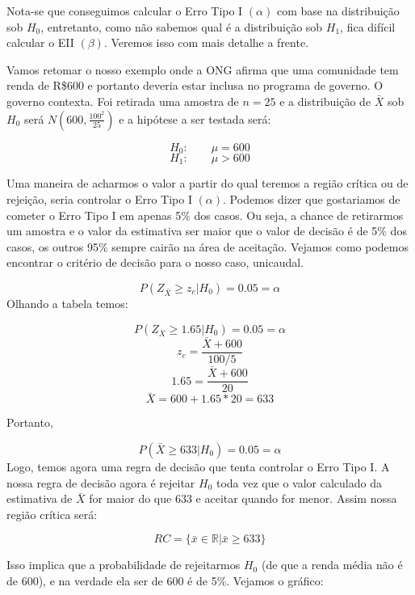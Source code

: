 \documentclass[
  letterpaper,
  DIV=11,
  numbers=noendperiod]{scrartcl}
\begin{document}
Nota-se que conseguimos calcular o Erro Tipo I \((\alpha)\) com base na
distribuição sob \(H_0\), entretanto, como não sabemos qual é a
distribuição sob \(H_1\), fica difícil calcular o EII \((\beta)\).
Veremos isso com mais detalhe a frente.

Vamos retomar o nosso exemplo onde a ONG afirma que uma comunidade tem
renda de R\$600 e portanto deveria estar inclusa no programa de governo.
O governo contexta. Foi retirada uma amostra de \(n=25\) e a
distribuição de \(\bar{X}\) sob \(H_0\) será \(N(600,\frac{100^2}{25})\)
e a hipótese a ser testada será:

\[H_0: \qquad \mu=600\] \[H_1: \qquad \mu>600\]

Uma maneira de acharmos o valor a partir do qual teremos a região
crítica ou de rejeição, seria controlar o Erro Tipo I \((\alpha)\).
Podemos dizer que gostariamos de cometer o Erro Tipo I em apenas 5\% dos
casos. Ou seja, a chance de retirarmos um amostra e o valor da
estimativa ser maior que o valor de decisão é de 5\% dos casos, os
outros 95\% sempre cairão na área de aceitação. Vejamos como podemos
encontrar o critério de decisão para o nosso caso, unicaudal.

\[P(Z_{\bar{X}} \geq z_c|H_0)=0.05= \alpha\] Olhando a tabela temos:

\[P(Z_{\bar{X}} \geq 1.65|H_0)=0.05= \alpha\]
\[z_c =\frac{\bar{X}+600}{100/5}\] \[1.65 = \frac{\bar{X}+600}{20}\]
\[\bar{X}=600+1.65*20=633\]

Portanto,

\[P(\bar{X}\geq 633|H_0)=0.05= \alpha\] Logo, temos agora uma regra de
decisão que tenta controlar o Erro Tipo I. A nossa regra de decisão
agora é rejeitar \(H_0\) toda vez que o valor calculado da estimativa de
\(\bar{X}\) for maior do que 633 e aceitar quando for menor. Assim nossa
região crítica será:

\[RC =\{\bar{x} \in \mathbb{R} | \bar{x} \geq 633\}\]

Isso implica que a probabilidade de rejeitarmos \(H_0\) (de que a renda
média não é de 600), e na verdade ela ser de 600 é de 5\%. Vejamos o
gráfico:
\end{document}
